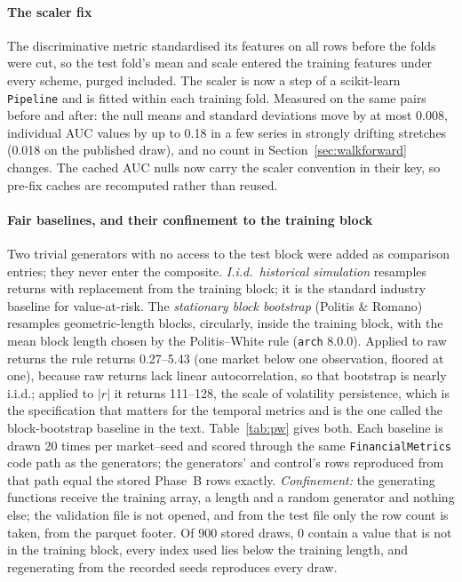 \documentclass[11pt,a4paper]{article}
\makeatletter
\DeclareRobustCommand{\_}{\ifmmode\nfss@text{\textunderscore}\else\textunderscore\allowbreak\fi}
\makeatother
\begin{document}
\paragraph{The scaler fix}\label{sec:scaler} The discriminative metric standardised its features on all rows before the folds were cut, so the test fold's mean and scale entered the training features under every scheme, purged included. The scaler is now a step of a scikit-learn \texttt{Pipeline} and is fitted within each training fold. Measured on the same pairs before and after: the null means and standard deviations move by at most 0.008, individual AUC values by up to 0.18 in a few series in strongly drifting stretches (0.018 on the published draw), and no count in Section~\ref{sec:walkforward} changes. The cached AUC nulls now carry the scaler convention in their key, so pre-fix caches are recomputed rather than reused.

\paragraph{Fair baselines, and their confinement to the training block}\label{sec:baseline-methods} Two trivial generators with no access to the test block were added as comparison entries; they never enter the composite. \emph{I.i.d.\ historical simulation} resamples returns with replacement from the training block; it is the standard industry baseline for value-at-risk. The \emph{stationary block bootstrap} (Politis \& Romano) resamples geometric-length blocks, circularly, inside the training block, with the mean block length chosen by the Politis--White rule (\texttt{arch} 8.0.0). Applied to raw returns the rule returns 0.27--5.43 (one market below one observation, floored at one), because raw returns lack linear autocorrelation, so that bootstrap is nearly i.i.d.; applied to $|r|$ it returns 111--128, the scale of volatility persistence, which is the specification that matters for the temporal metrics and is the one called the block-bootstrap baseline in the text. Table~\ref{tab:pw} gives both. Each baseline is drawn 20 times per market--seed and scored through the same \texttt{FinancialMetrics} code path as the generators; the generators' and control's rows reproduced from that path equal the stored Phase~B rows exactly. \emph{Confinement:} the generating functions receive the training array, a length and a random generator and nothing else; the validation file is not opened, and from the test file only the row count is taken, from the parquet footer. Of 900 stored draws, 0 contain a value that is not in the training block, every index used lies below the training length, and regenerating from the recorded seeds reproduces every draw.
\end{document}
